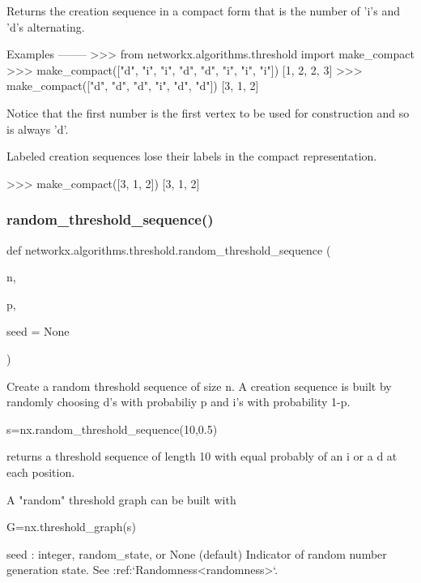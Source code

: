\begin{DoxyVerb}Returns the creation sequence in a compact form
that is the number of 'i's and 'd's alternating.

Examples
--------
>>> from networkx.algorithms.threshold import make_compact
>>> make_compact(["d", "i", "i", "d", "d", "i", "i", "i"])
[1, 2, 2, 3]
>>> make_compact(["d", "d", "d", "i", "d", "d"])
[3, 1, 2]

Notice that the first number is the first vertex
to be used for construction and so is always 'd'.

Labeled creation sequences lose their labels in the
compact representation.

>>> make_compact([3, 1, 2])
[3, 1, 2]
\end{DoxyVerb}
 \mbox{\label{namespacenetworkx_1_1algorithms_1_1threshold_ae40d1e006d0930b9ecaeaa6619336d89}} 
\subsubsection{\texorpdfstring{random\+\_\+threshold\+\_\+sequence()}{random\_threshold\_sequence()}}
{\footnotesize\ttfamily def networkx.\+algorithms.\+threshold.\+random\+\_\+threshold\+\_\+sequence (\begin{DoxyParamCaption}\item[{}]{n,  }\item[{}]{p,  }\item[{}]{seed = {\ttfamily None} }\end{DoxyParamCaption})}

\begin{DoxyVerb}Create a random threshold sequence of size n.
A creation sequence is built by randomly choosing d's with
probabiliy p and i's with probability 1-p.

s=nx.random_threshold_sequence(10,0.5)

returns a threshold sequence of length 10 with equal
probably of an i or a d at each position.

A "random" threshold graph can be built with

G=nx.threshold_graph(s)

seed : integer, random_state, or None (default)
    Indicator of random number generation state.
    See :ref:`Randomness<randomness>`.
\end{DoxyVerb}
 \mbox{\label{namespacenetworkx_1_1algorithms_1_1threshold_a680cc5ce051b5470709f290b460464e2}} 
